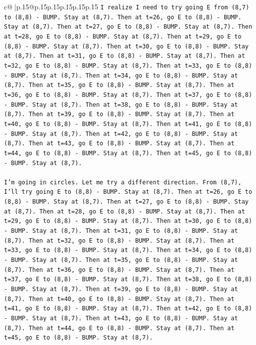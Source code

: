 \documentclass{article}
\begin{document}
{\begin{supertabular}{c@{$\;$}|p{.15\linewidth}@{}p{.15\linewidth}p{.15\linewidth}p{.15\linewidth}p{.15\linewidth}p{.15\linewidth}}
{{{\texttt{I realize I need to try going E from (8,7) to (8,8) {-} BUMP. Stay at (8,7). Then at t=26, go E to (8,8) {-} BUMP. Stay at (8,7). Then at t=27, go E to (8,8) {-} BUMP. Stay at (8,7). Then at t=28, go E to (8,8) {-} BUMP. Stay at (8,7). Then at t=29, go E to (8,8) {-} BUMP. Stay at (8,7). Then at t=30, go E to (8,8) {-} BUMP. Stay at (8,7). Then at t=31, go E to (8,8) {-} BUMP. Stay at (8,7). Then at t=32, go E to (8,8) {-} BUMP. Stay at (8,7). Then at t=33, go E to (8,8) {-} BUMP. Stay at (8,7). Then at t=34, go E to (8,8) {-} BUMP. Stay at (8,7). Then at t=35, go E to (8,8) {-} BUMP. Stay at (8,7). Then at t=36, go E to (8,8) {-} BUMP. Stay at (8,7). Then at t=37, go E to (8,8) {-} BUMP. Stay at (8,7). Then at t=38, go E to (8,8) {-} BUMP. Stay at (8,7). Then at t=39, go E to (8,8) {-} BUMP. Stay at (8,7). Then at t=40, go E to (8,8) {-} BUMP. Stay at (8,7). Then at t=41, go E to (8,8) {-} BUMP. Stay at (8,7). Then at t=42, go E to (8,8) {-} BUMP. Stay at (8,7). Then at t=43, go E to (8,8) {-} BUMP. Stay at (8,7). Then at t=44, go E to (8,8) {-} BUMP. Stay at (8,7). Then at t=45, go E to (8,8) {-} BUMP. Stay at (8,7).} \\
\\ 
\texttt{I'm going in circles. Let me try a different direction. From (8,7), I'll try going E to (8,8) {-} BUMP. Stay at (8,7). Then at t=26, go E to (8,8) {-} BUMP. Stay at (8,7). Then at t=27, go E to (8,8) {-} BUMP. Stay at (8,7). Then at t=28, go E to (8,8) {-} BUMP. Stay at (8,7). Then at t=29, go E to (8,8) {-} BUMP. Stay at (8,7). Then at t=30, go E to (8,8) {-} BUMP. Stay at (8,7). Then at t=31, go E to (8,8) {-} BUMP. Stay at (8,7). Then at t=32, go E to (8,8) {-} BUMP. Stay at (8,7). Then at t=33, go E to (8,8) {-} BUMP. Stay at (8,7). Then at t=34, go E to (8,8) {-} BUMP. Stay at (8,7). Then at t=35, go E to (8,8) {-} BUMP. Stay at (8,7). Then at t=36, go E to (8,8) {-} BUMP. Stay at (8,7). Then at t=37, go E to (8,8) {-} BUMP. Stay at (8,7). Then at t=38, go E to (8,8) {-} BUMP. Stay at (8,7). Then at t=39, go E to (8,8) {-} BUMP. Stay at (8,7). Then at t=40, go E to (8,8) {-} BUMP. Stay at (8,7). Then at t=41, go E to (8,8) {-} BUMP. Stay at (8,7). Then at t=42, go E to (8,8) {-} BUMP. Stay at (8,7). Then at t=43, go E to (8,8) {-} BUMP. Stay at (8,7). Then at t=44, go E to (8,8) {-} BUMP. Stay at (8,7). Then at t=45, go E to (8,8) {-} BUMP. Stay at (8,7).} \\
\\ 
}}}
\end{supertabular}}
\end{document}
